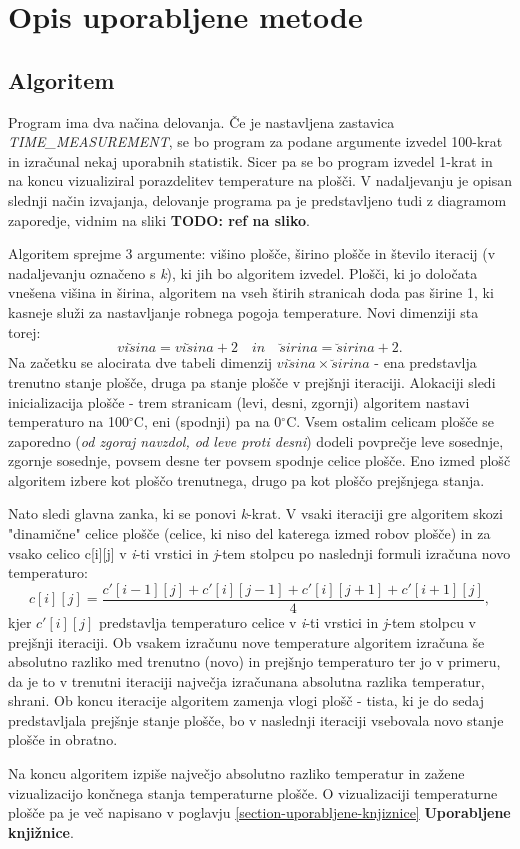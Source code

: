 \documentclass[a4paper,11pt]{article}
\begin{document}
\section{Opis uporabljene metode}
\subsection{Algoritem}
Program ima dva načina delovanja. Če je nastavljena zastavica \textit{TIME\_MEASUREMENT}, se bo program za podane argumente izvedel 100-krat in izračunal nekaj uporabnih statistik. Sicer pa se bo program izvedel 1-krat in na koncu vizualiziral porazdelitev temperature na plošči. V nadaljevanju je opisan slednji način izvajanja, delovanje programa pa je predstavljeno tudi z diagramom zaporedje, vidnim na sliki \textbf{TODO: ref na sliko}.
\indent \par Algoritem sprejme 3 argumente: višino plošče, širino plošče in število iteracij (v nadaljevanju označeno s \textit{k}), ki jih bo algoritem izvedel. Plošči, ki jo določata vnešena višina in širina, algoritem na vseh štirih stranicah doda pas širine 1, ki kasneje služi za nastavljanje robnega pogoja temperature. Novi dimenziji sta torej: 
\[
vi\breve{s}ina = vi\breve{s}ina + 2 \quad in \quad \breve{s}irina = \breve{s}irina + 2.
\]
Na začetku se alocirata dve tabeli dimenzij $ vi\breve{s}ina \times \breve{s}irina$ - ena predstavlja trenutno stanje plošče, druga pa stanje plošče v prejšnji iteraciji. Alokaciji sledi inicializacija plošče - trem stranicam (levi, desni, zgornji) algoritem nastavi temperaturo na 100$^{\circ}$C, eni (spodnji) pa na 0$^{\circ}$C. Vsem ostalim celicam plošče se zaporedno (\textit{od zgoraj navzdol, od leve proti desni}) dodeli povprečje leve sosednje, zgornje sosednje, povsem desne ter povsem spodnje celice plošče. Eno izmed plošč algoritem izbere kot ploščo trenutnega, drugo pa kot ploščo prejšnjega stanja.
\indent \par Nato sledi glavna zanka, ki se ponovi \textit{k}-krat. V vsaki iteraciji gre algoritem skozi "dinamične" celice plošče (celice, ki niso del katerega izmed robov plošče) in za vsako celico c[i][j] v \textit{i}-ti vrstici in \textit{j}-tem stolpcu po naslednji formuli izračuna novo temperaturo:
\[ c[i][j] = \frac{c'[i - 1][j] + c'[i][j - 1] + c'[i][j + 1] + c'[i + 1][j]}{4},\]
kjer $c'[i][j]$ predstavlja temperaturo celice v \textit{i}-ti vrstici in \textit{j}-tem stolpcu v prejšnji iteraciji. Ob vsakem izračunu nove temperature algoritem izračuna še absolutno razliko med trenutno (novo) in prejšnjo temperaturo ter jo v primeru, da je to v trenutni iteraciji največja izračunana absolutna razlika temperatur, shrani. Ob koncu iteracije algoritem zamenja vlogi plošč - tista, ki je do sedaj predstavljala prejšnje stanje plošče, bo v naslednji iteraciji vsebovala novo stanje plošče in obratno.
\indent \par Na koncu algoritem izpiše največjo absolutno razliko temperatur in zažene vizualizacijo končnega stanja temperaturne plošče. O vizualizaciji temperaturne plošče pa je več napisano v poglavju \ref{section-uporabljene-knjiznice} \textbf{Uporabljene knjižnice}.
\end{document}
